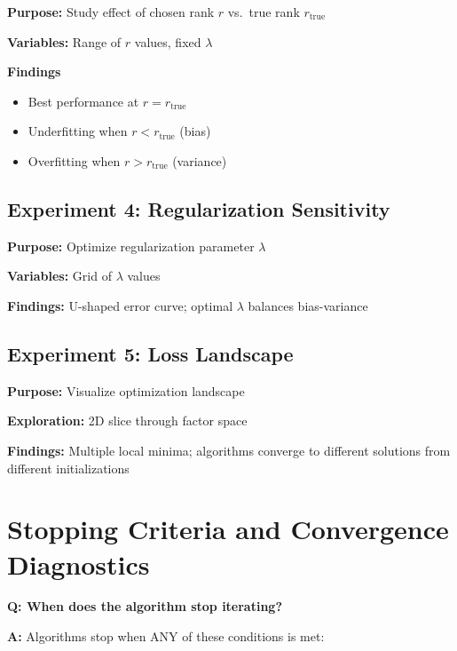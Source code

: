 \documentclass[11pt,oneside]{article}
\newcommand{\question}[1]{\textbf{Q: #1}}
\newcommand{\answer}{\textbf{A: }}
\begin{document}
\textbf{Purpose:} Study effect of chosen rank $r$ vs.\ true rank $r_{\text{true}}$

\textbf{Variables:} Range of $r$ values, fixed $\lambda$

\textbf{Findings}
\begin{itemize}
    \item Best performance at $r = r_{\text{true}}$
    \item Underfitting when $r < r_{\text{true}}$ (bias)
    \item Overfitting when $r > r_{\text{true}}$ (variance)
\end{itemize}

\subsection*{Experiment 4: Regularization Sensitivity}

\textbf{Purpose:} Optimize regularization parameter $\lambda$

\textbf{Variables:} Grid of $\lambda$ values

\textbf{Findings:} U-shaped error curve; optimal $\lambda$ balances bias-variance

\subsection*{Experiment 5: Loss Landscape}

\textbf{Purpose:} Visualize optimization landscape

\textbf{Exploration:} 2D slice through factor space

\textbf{Findings:} Multiple local minima; algorithms converge to different solutions from different initializations

\section{Stopping Criteria and Convergence Diagnostics}\label{sec:stopping}

\question{When does the algorithm stop iterating?}

\answer Algorithms stop when ANY of these conditions is met:
\end{document}
